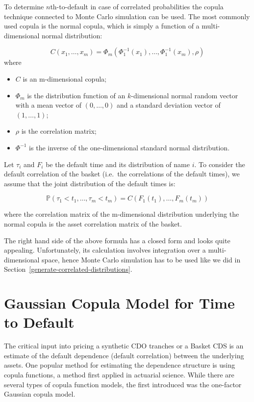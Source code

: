 To determine \(n\)th-to-default in case of correlated probabilities the
copula technique connected to Monte Carlo simulation can be used. The
most commonly used copula is the normal copula, which is simply a
function of a multi-dimensional normal distribution:

\[C(x_1,\ldots,x_m) = \Phi_m(\Phi^{-1}_1(x_1),\ldots,\Phi^{-1}_1(x_m), \rho) \]
where

\begin{itemize}
	\tightlist
	\item
	\(C\) is an m-dimensional copula;
	\item
	\(\Phi_m\) is the distribution function of an \(k\)-dimensional normal
	random vector with a mean vector of \((0,\ldots,0)\) and a standard
	deviation vector of \((1,\dots,1)\);
	\item
	\(\rho\) is the correlation matrix;
	\item
	\(\Phi^{-1}\) is the inverse of the one-dimensional standard normal
	distribution.
\end{itemize}

Let \(\tau_i\) and \(F_i\) be the default time and its distribution of
name \(i\). To consider the default correlation of the basket (i.e.~the
correlations of the default times), we assume that the joint
distribution of the default times is:

\[\mathbb{P}(\tau_1 <t_1,\ldots, \tau_m <t_m) = C(F_1(t_1),\ldots, F_m(t_m))\]

where the correlation matrix of the m-dimensional distribution
underlying the normal copula is the asset correlation matrix of the
basket.

The right hand side of the above formula has a closed form and looks
quite appealing. Unfortunately, its calculation involves integration
over a multi-dimensional space, hence Monte Carlo
simulation has to be used like we did in Section~\ref{generate-correlated-distributions}.

\section{Gaussian Copula Model for Time to Default}
The critical input into pricing a synthetic CDO tranches or a Basket CDS is an estimate of the default dependence (default correlation) between the underlying assets.
One popular method for estimating the dependence structure is using copula functions, a method first applied in actuarial science. While there are several types of copula function models, the first introduced was the one-factor Gaussian copula model.


